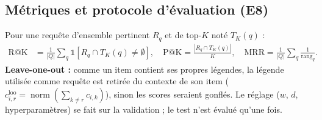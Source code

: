 \subsection{Métriques et protocole d'évaluation (E8)}
Pour une requête d'ensemble pertinent $R_q$ et de top-$K$ noté $T_K(q)$ :
\begin{align}
  \text{R@K}&=\tfrac1{|Q|}\sum_q\mathbb 1[R_q\cap T_K(q)\neq\emptyset],\quad
  \text{P@K}=\tfrac{|R_q\cap T_K(q)|}{K},\quad
  \text{MRR}=\tfrac1{|Q|}\sum_q\tfrac1{\text{rang}_q}.
\end{align}
\textbf{Leave-one-out :} comme un item contient ses propres légendes, la légende utilisée comme requête est retirée du
contexte de son item ($c^{\text{loo}}_{i,r}=\operatorname{norm}(\sum_{k\neq r}c_{i,k})$), sinon les scores seraient gonflés.
Le réglage ($w$, $d$, hyperparamètres) se fait sur la validation ; le test n'est évalué qu'une fois.
